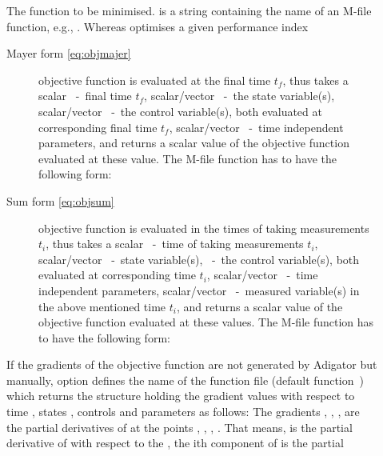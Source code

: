 \begin{description}
\item[] The function to be minimised. 
  is a string containing the name of an M-file function, e.g.,
  . Whereas  optimises a given performance
  index 
  \begin{description}
  \item[Mayer form \eqref{eq:objmajer}] objective function is
    evaluated at the final time $t_{f}$, thus  takes a
    scalar ~-~final time $t_{f}$, scalar/vector
    ~-~the state variable(s), scalar/vector ~-~the
    control variable(s), both evaluated at corresponding  final time
    $t_{f}$, scalar/vector ~-~time independent parameters,
    and returns a scalar value  of the objective function
    evaluated at these value. The M-file function has to have the
    following form: 
    {\small } 
  \item[Sum form \eqref{eq:objsum}] objective function is evaluated in
    the times of taking measurements $t_{i}$, thus  takes
    a scalar ~-~time of taking measurements $t_{i}$,
    scalar/vector ~-~state variable(s), ~-~the
    control variable(s), both evaluated at corresponding time $t_{i}$,
    scalar/vector ~-~time independent parameters,
    scalar/vector ~-~measured variable(s) in the above
    mentioned time $t_{i}$, and returns a scalar value  of
    the objective function evaluated at these values. The M-file
    function has to have the following form:   
    {\small } 
   \end{description}
   If the gradients of the objective function are not generated by
   Adigator but manually, option  defines the name of
   the function file (default function~) which returns
   the structure  holding the
   gradient values with respect to time , states ,
   controls  and parameters  as follows:
   {\small }
   The gradients , , ,
    are the partial derivatives of  at the
   points , , , . That means,
    is the partial derivative of  with respect
   to the , the ith component of  is the partial

\end{description}
